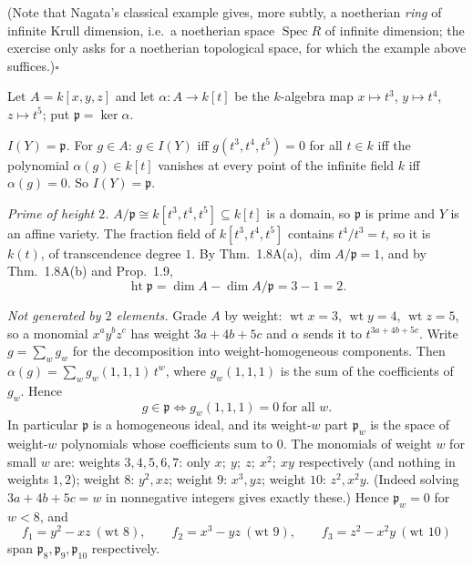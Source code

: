 \documentclass[11pt]{article}
\begin{document}
(Note that Nagata's classical example gives, more subtly, a noetherian \emph{ring} of infinite Krull dimension, i.e.\ a noetherian space $\operatorname{Spec}R$ of infinite dimension; the exercise only asks for a noetherian topological space, for which the example above suffices.)\hfill$\square$

\pf
Let $A=k[x,y,z]$ and let $\alpha:A\to k[t]$ be the $k$-algebra map $x\mapsto t^3$, $y\mapsto t^4$, $z\mapsto t^5$; put $\mathfrak p=\ker\alpha$.

\emph{$I(Y)=\mathfrak p$.} For $g\in A$: $g\in I(Y)$ iff $g(t^3,t^4,t^5)=0$ for all $t\in k$ iff the polynomial $\alpha(g)\in k[t]$ vanishes at every point of the infinite field $k$ iff $\alpha(g)=0$. So $I(Y)=\mathfrak p$.

\emph{Prime of height $2$.} $A/\mathfrak p\cong k[t^3,t^4,t^5]\subseteq k[t]$ is a domain, so $\mathfrak p$ is prime and $Y$ is an affine variety. The fraction field of $k[t^3,t^4,t^5]$ contains $t^4/t^3=t$, so it is $k(t)$, of transcendence degree $1$. By Thm.~1.8A(a), $\dim A/\mathfrak p=1$, and by Thm.~1.8A(b) and Prop.~1.9,
\[
\operatorname{ht}\mathfrak p=\dim A-\dim A/\mathfrak p=3-1=2.
\]

\emph{Not generated by $2$ elements.} Grade $A$ by weight: $\operatorname{wt}x=3$, $\operatorname{wt}y=4$, $\operatorname{wt}z=5$, so a monomial $x^ay^bz^c$ has weight $3a+4b+5c$ and $\alpha$ sends it to $t^{3a+4b+5c}$. Write $g=\sum_wg_w$ for the decomposition into weight-homogeneous components. Then $\alpha(g)=\sum_w g_w(1,1,1)\,t^w$, where $g_w(1,1,1)$ is the sum of the coefficients of $g_w$. Hence
\[
g\in\mathfrak p\iff g_w(1,1,1)=0\ \text{for all }w.
\]
In particular $\mathfrak p$ is a homogeneous ideal, and its weight-$w$ part $\mathfrak p_w$ is the space of weight-$w$ polynomials whose coefficients sum to $0$. The monomials of weight $w$ for small $w$ are: weights $3,4,5,6,7$: only $x;\ y;\ z;\ x^2;\ xy$ respectively (and nothing in weights $1,2$); weight $8$: $y^2,xz$; weight $9$: $x^3,yz$; weight $10$: $z^2,x^2y$. (Indeed solving $3a+4b+5c=w$ in nonnegative integers gives exactly these.) Hence $\mathfrak p_w=0$ for $w<8$, and
\[
f_1=y^2-xz\ (\text{wt }8),\qquad f_2=x^3-yz\ (\text{wt }9),\qquad f_3=z^2-x^2y\ (\text{wt }10)
\]
span $\mathfrak p_8,\mathfrak p_9,\mathfrak p_{10}$ respectively.
\end{document}

